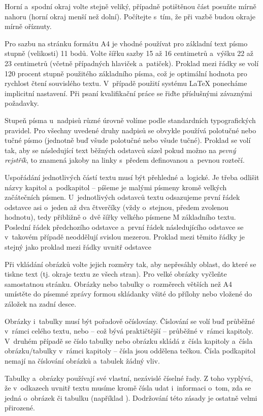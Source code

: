 Horní a~spodní okraj volte stejně veliký, případně potištěnou část posuňte mírně nahoru (horní okraj menší než dolní). Počítejte s~tím, že při vazbě budou okraje mírně oříznuty.

Pro sazbu na stránku formátu A4 je vhodné používat pro základní text písmo stupně (velikosti) 11 bodů. Volte šířku sazby 15 až 16 centimetrů a~výšku 22 až 23 centimetrů (včetně případných hlaviček a~patiček). Proklad mezi řádky se volí 120 procent stupně použitého základního písma, což je optimální hodnota pro rychlost čtení souvislého textu. V~případě použití systému LaTeX ponecháme implicitní nastavení. Při psaní kvalifikační práce se řiďte příslušnými závaznými požadavky.

Stupeň písma u~nadpisů různé úrovně volíme podle standardních typografických pravidel. 
Pro všechny uvedené druhy nadpisů se obvykle používá polotučné nebo tučné písmo (jednotně buď všude polotučné nebo všude tučné). Proklad se volí tak, aby se následující text běžných odstavců sázel pokud možno na {\it pevný rejstřík}, to znamená jakoby na linky s~předem definovanou a~pevnou roztečí.

Uspořádání jednotlivých částí textu musí být přehledné a~logické. Je třeba odlišit názvy kapitol a~podkapitol -- píšeme je malými písmeny kromě velkých začátečních písmen. U~jednotlivých odstavců textu odsazujeme první řádek odstavce asi o~jeden až dva čtverčíky (vždy o~stejnou, předem zvolenou hodnotu), tedy přibližně o~dvě šířky velkého písmene M základního textu. Poslední řádek předchozího odstavce a~první řádek následujícího odstavce se v~takovém případě neoddělují svislou mezerou. Proklad mezi těmito řádky je stejný jako proklad mezi řádky uvnitř odstavce

Při vkládání obrázků volte jejich rozměry tak, aby nepřesáhly oblast, do které se tiskne text (tj. okraje textu ze všech stran). Pro velké obrázky vyčleňte samostatnou stránku. Obrázky nebo tabulky o~rozměrech větších než A4 umístěte do písemné zprávy formou skládanky všité do přílohy nebo vložené do záložek na zadní desce.

Obrázky i~tabulky musí být pořadově očíslovány. Číslování se volí buď průběžné v~rámci celého textu, nebo -- což bývá praktičtější -- průběžné v~rámci kapitoly. V~druhém případě se číslo tabulky nebo obrázku skládá z~čísla kapitoly a~čísla obrázku/tabulky v~rámci kapitoly -- čísla jsou oddělena tečkou. Čísla podkapitol nemají na číslování obrázků a~tabulek žádný vliv.

Tabulky a~obrázky používají své vlastní, nezávislé číselné řady. Z toho vyplývá, že v~odkazech uvnitř textu musíme kromě čísla udat i~informaci o~tom, zda se jedná o~obrázek či tabulku (například ). Dodržování této zásady je ostatně velmi přirozené.


